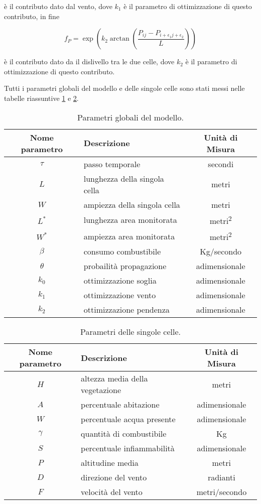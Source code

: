 \documentclass[draft]{article}
\newcommand{\e}{\epsilon}
\newcommand{\combvar}{Kg}
\begin{document}
è il contributo dato dal vento, dove $k_1$ è il parametro di ottimizzazione di
questo contributo, in fine

\begin{equation}\label{eq:slope}
f_P = \exp\left(k_2\arctan\left(\frac{P_{ij}-P_{i+\e_1j+\e_2}}{L}\right)\right)
\end{equation}

è il contributo dato da il dislivello tra le due celle, dove $k_2$ è il
parametro di ottimizzazione di questo contributo.

Tutti i parametri globali del modello e delle singole celle sono stati messi
nelle tabelle riassuntive \ref{tab:globals} e \ref{tab:params}.

\begin{table}
\centering
\begin{tabular}{|c|l|c|}
	\hline
	\textbf{Nome parametro} & \textbf{Descrizione} & \textbf{Unità di Misura}\\
	\hline
	$\tau$ & passo temporale & secondi\\
	$L$ & lunghezza della singola cella & metri\\
	$W$ & ampiezza della singola cella & metri\\
	$L^*$ & lunghezza area monitorata & metri\textsuperscript{2}\\
	$W^*$ & ampiezza area monitorata & metri\textsuperscript{2}\\
	$\beta$ & consumo combustibile & \combvar/secondo\\
	$\theta$ & probailità propagazione & adimensionale\\
	$k_0$ & ottimizzazione soglia & adimensionale\\
	$k_1$ & ottimizzazione vento & adimensionale\\
	$k_2$ & ottimizzazione pendenza & adimensionale\\
	\hline
\end{tabular}
\caption{Parametri globali del modello.}
\label{tab:globals}
\end{table}

\begin{table}
\centering
\begin{tabular}{|c|l|c|}
	\hline
	\textbf{Nome parametro} & \textbf{Descrizione} & \textbf{Unità di Misura}\\
	\hline
	$H$ & altezza media della vegetazione & metri\\
	$A$ & percentuale abitazione & adimensionale\\
	$W$ & percentuale acqua presente & adimensionale\\
	$\gamma$ & quantità di combustibile & \combvar\\
	$S$ & percentuale infiammabilità & adimensionale\\
	$P$ & altitudine media & metri\\
	$D$ & direzione del vento & radianti\\
	$F$ & velocità del vento & metri/secondo\\
	\hline
\end{tabular}
\caption{Parametri delle singole celle.}
\label{tab:params}
\end{table}
\end{document}
